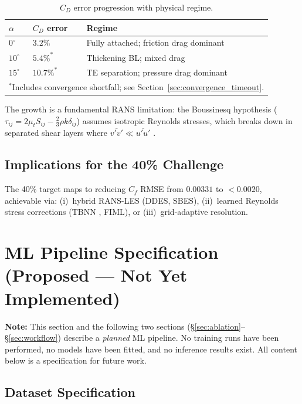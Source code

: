 \documentclass[11pt,a4paper]{article}
\begin{document}
\begin{table}[!ht]
\centering
\caption{$C_D$ error progression with physical regime.}
\begin{tabular}{lll}
\toprule
$\alpha$ & $C_D$ error & Regime \\
\midrule
$0^\circ$  & $3.2\%$  & Fully attached; friction drag dominant \\
$10^\circ$ & $5.4\%^*$  & Thickening BL; mixed drag \\
$15^\circ$ & $10.7\%^*$ & TE separation; pressure drag dominant \\
\bottomrule
\multicolumn{3}{l}{\footnotesize $^*$Includes convergence shortfall; see
  Section~\ref{sec:convergence_timeout}.}
\end{tabular}
\end{table}

The growth is a fundamental RANS limitation: the Boussinesq hypothesis
($\tau_{ij} = 2\mu_t S_{ij} - \tfrac{2}{3}\rho k \delta_{ij}$) assumes
isotropic Reynolds stresses, which breaks down in separated shear layers
where $\overline{v'v'} \ll \overline{u'u'}$ \cite{Wilcox2006}.

\subsection{Implications for the 40\% Challenge}

The 40\% target maps to reducing $C_f$ RMSE from $0.00331$ to $<0.0020$,
achievable via: (i)~hybrid RANS-LES (DDES, SBES), (ii)~learned Reynolds stress
corrections (TBNN \cite{Ling2016}, FIML), or (iii)~grid-adaptive resolution.

\section{ML Pipeline Specification (Proposed --- Not Yet Implemented)}
\label{sec:ml}

\textbf{Note:} This section and the following two sections
(\S\ref{sec:ablation}--\S\ref{sec:workflow}) describe a \emph{planned}
ML pipeline.  No training runs have been performed, no models have been
fitted, and no inference results exist.  All content below is a
specification for future work.

\subsection{Dataset Specification}
\end{document}
